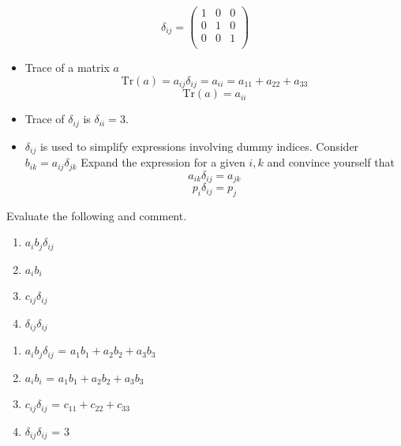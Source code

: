 \begin{equation*}
\delta_{ij} = \left( \begin{array}{ccc}
1 & 0 & 0 \\
0 & 1 & 0 \\
0 & 0 & 1 \\
\end{array}\right) 
\end{equation*} 

\begin{itemize}
\item Trace of a matrix $a$
$$ \text{Tr}(a) = a_{ij}\delta_{ij} = a_{ii} = a_{11}+a_{22}+a_{33}$$
$$\boxed{ \text{Tr}(a) = a_{ii} }$$

\item Trace of $\delta_{ij}$ is $\delta_{ii}=3$.

\item $\delta_{ij}$ is used to simplify expressions involving dummy indices.
Consider $b_{ik} = a_{ij} \delta_{jk}$ Expand the expression for a given $i,k$ and convince yourself that 
$$ \boxed{a_{ik} \delta_{ij} = a_{jk} }$$
$$p_i \delta_{ij} = p_j$$
\end{itemize}


\begin{question}
Evaluate the following and comment.

	\begin{enumerate}
		\item $a_i b_j \delta_{ij}$
		\item $a_i b_i$
		\item $c_{ij} \delta_{ij}$
		\item $\delta_{ij} \delta_{ij}$
	\end{enumerate}
\end{question}
\begin{solution}[print]
	\begin{enumerate}
		\item $a_i b_j \delta_{ij}$ = $a_1 b_1 + a_2 b_2 + a_3 b_3$
		\item $a_i b_i$ = $a_1 b_1 + a_2 b_2 + a_3 b_3$
		\item $c_{ij} \delta_{ij}$ = $c_{11} + c_{22} + c_{33}$
		\item $\delta_{ij} \delta_{ij}$ = $3$
	\end{enumerate}
\end{solution}



